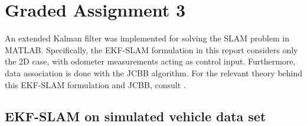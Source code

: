 \section{Graded Assignment 3}\label{sec:graded_assignment_3}


An extended Kalman filter was implemented for solving the SLAM problem in MATLAB. Specifically, the EKF-SLAM formulation in this report considers only the 2D case, with odometer measurements acting as control input. Furthermore, data association is done with the JCBB algorithm. For the relevant theory behind this EKF-SLAM formulation and JCBB, consult \cite[p. 185 - 196]{Edmund}.

\subsection{EKF-SLAM on simulated vehicle data set}




